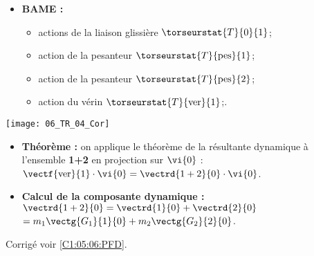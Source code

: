 \begin{minipage}[c]{.6\linewidth}
\begin{itemize}
\item \textbf{BAME :}
\begin{itemize}
\item actions de la liaison glissière $\torseurstat{T}{0}{1}$;
\item action de la pesanteur $\torseurstat{T}{\text{pes}}{1}$;
\item action de la pesanteur $\torseurstat{T}{\text{pes}}{2}$;
\item action du vérin $\torseurstat{T}{\text{ver}}{1}$;.
\end{itemize}
\end{itemize}
\end{minipage} \hfil
\begin{minipage}[c]{.35\linewidth}
\begin{center}
\texttt{[image: 06\_TR\_04\_Cor]}
\end{center}
\end{minipage}

\begin{itemize}
\item \textbf{Théorème :} on applique le théorème de la résultante dynamique à l'ensemble \textbf{1+2} en projection sur 
$\vi{0}$ : 
$\vectf{\text{ver}}{1}\cdot \vi{0}  = \vectrd{1+2}{0}\cdot \vi{0}$.
\item \textbf{Calcul de la composante dynamique :} 
$\vectrd{1+2}{0} = \vectrd{1}{0} +\vectrd{2}{0}$  $= m_1\vectg{G_1}{1}{0} +m_2 \vectg{G_2}{2}{0}$.
\end{itemize}
\else
\fi

\ifprof
\else
\begin{flushright}
\footnotesize{Corrigé  voir \ref{C1:05:06:PFD}.}
\end{flushright}%
\fi